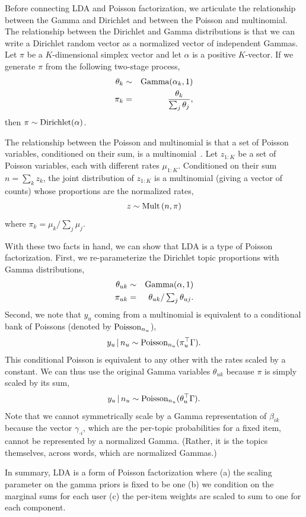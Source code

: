 \documentclass{sig-alternate}
\begin{document}
Before connecting LDA and Poisson factorization, we articulate the
relationship between the Gamma and Dirichlet and between the Poisson
and multinomial.  The relationship between the Dirichlet and Gamma
distributions is that we can write a Dirichlet random vector as a
normalized vector of independent Gammas.  Let $\pi$ be a
$K$-dimensional simplex vector and let $\alpha$ is a positive
$K$-vector.  If we generate $\pi$ from the following two-stage
process,
\begin{eqnarray*}
  \theta_k &\sim& \textrm{Gamma}(\alpha_k, 1) \\
  \pi_k &=& \frac{\theta_k}{\sum_{j} \theta_j},
\end{eqnarray*}
then $\pi \sim \textrm{Dirichlet}(\alpha)$.

The relationship between the Poisson and multinomial is that a set of
Poisson variables, conditioned on their sum, is a
multinomial~\cite{Johnson:2005}.  Let $z_{1:K}$ be a set of Poisson
variables, each with different rates $\mu_{1:K}$.  Conditioned on
their sum $n = \sum_k z_k$, the joint distribution of $z_{1:K}$ is a
multinomial (giving a vector of counts) whose proportions are the
normalized rates,
\begin{equation*}
  z \sim \textrm{Mult}\left(n, \pi \right)
\end{equation*}
where $\pi_k = \mu_k / \sum_j \mu_j$.

With these two facts in hand, we can show that LDA is a type of
Poisson factorization.  First, we re-parameterize the Dirichlet topic
proportions with Gamma distributions,
\begin{eqnarray*}
  \theta_{uk} &\sim& \textrm{Gamma}(\alpha, 1) \\
  \pi_{uk} &=& \theta_{uk} / \textstyle \sum_{j} \theta_{uj}.
\end{eqnarray*}
Second, we note that $y_u$ coming from a multinomial is equivalent to
a conditional bank of Poissons (denoted by $\textrm{Poisson}_{n_u}$),
\begin{equation*}
  y_u \,\vert\, n_u \sim \textrm{Poisson}_{n_u}(\pi_u^\top \Gamma).
\end{equation*}
This conditional Poisson is equivalent to any other with the rates
scaled by a constant.  We can thus use the original Gamma variables
$\theta_{uk}$ because $\pi$ is simply scaled by its sum,
\begin{equation*}
  y_u \,\vert\, n_u \sim \textrm{Poisson}_{n_u}(\theta_u^\top \Gamma).
\end{equation*}
Note that we cannot symmetrically scale by a Gamma representation of
$\beta_{ik}$ because the vector $\gamma_{\cdot i}$, which are the
per-topic probabilities for a fixed item, cannot be represented by a
normalized Gamma.  (Rather, it is the topics themselves, across words,
which are normalized Gammas.)

In summary, LDA is a form of Poisson factorization where (a) the
scaling parameter on the gamma priors is fixed to be one (b) we
condition on the marginal sums for each user (c) the per-item weights
are scaled to sum to one for each component.

\end{document}
